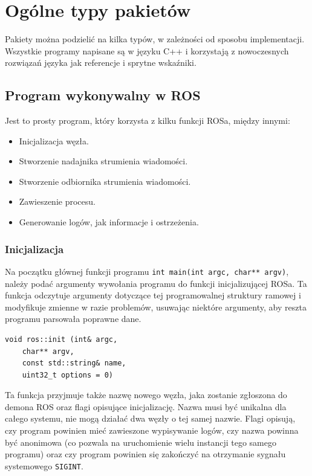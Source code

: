	
\section{Ogólne typy pakietów}
	Pakiety można podzielić na kilka typów, w zależności od sposobu implementacji.
	Wszystkie programy napisane są w języku C++ i korzystają z nowoczesnych rozwiązań języka jak referencje i sprytne wskaźniki.
	
	\subsection{Program wykonywalny w ROS}
		\label{sec:ros_exe}
		Jest to prosty program, który korzysta z kilku funkcji ROSa, między innymi:
		\begin{itemize}
			\item Inicjalizacja węzła.
			\item Stworzenie nadajnika strumienia wiadomości.
			\item Stworzenie odbiornika strumienia wiadomości.
			\item Zawieszenie procesu.
			\item Generowanie logów, jak informacje i ostrzeżenia.
		\end{itemize}
		
		\subsubsection{Inicjalizacja}
			Na początku głównej funkcji programu \texttt{int main(int argc, char** argv)}, należy podać argumenty wywołania programu
			do funkcji inicjalizującej ROSa. Ta funkcja odczytuje argumenty dotyczące tej programowalnej struktury ramowej i modyfikuje zmienne w razie problemów, usuwając niektóre argumenty, aby reszta programu parsowała poprawne dane.
			\begin{verbatim}
void ros::init (int& argc, 
	char** argv, 
	const std::string& name, 
	uint32_t options = 0)
			\end{verbatim}
			Ta funkcja przyjmuje także nazwę nowego węzła, jaka zostanie zgłoszona do demona ROS oraz flagi opisujące inicjalizację.
			Nazwa musi być unikalna dla całego systemu, nie mogą działać dwa węzły o tej samej nazwie.
			Flagi opisują, czy program powinien mieć zawieszone wypisywanie logów, czy nazwa powinna być anonimowa (co pozwala na uruchomienie wielu instancji tego samego programu)
			oraz czy program powinien się zakończyć na otrzymanie sygnału systemowego \texttt{SIGINT}.
			
